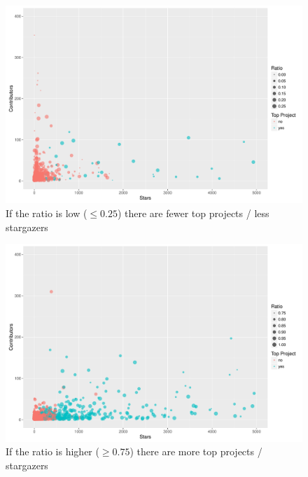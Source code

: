 \begin{figure}[h]
	\centering
	\label{fig:stars_contributors_low_ratio_projects}
	\includegraphics[page=1,scale=0.35]{../graphics/intro/stars_contributors_low_ratio_projects.pdf}
	\caption{If the ratio is low ($\leq 0.25$) there are fewer top projects / less stargazers}
\end{figure}

\begin{figure}
	\centering
	\label{fig:stars_contributors_high_ratio_projects}
	\includegraphics[page=1,scale=0.4]{../graphics/intro/stars_contributors_high_ratio_projects.pdf}
	\caption{If the ratio is higher ($\geq 0.75$) there are more top projects / stargazers}
\end{figure}

